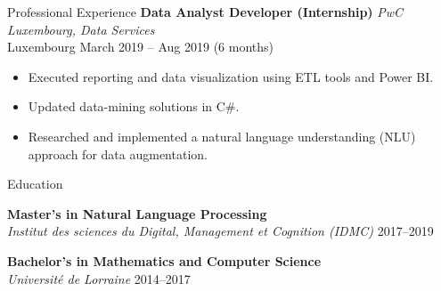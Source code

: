 \documentclass{resume} %
\begin{document}
\begin{rSection}{Professional Experience}
\textbf{Data Analyst Developer (Internship)} \hfill \textit{PwC Luxembourg, Data Services} \\
Luxembourg \hfill March 2019 -- Aug 2019 (6 months)
\begin{itemize}
    \item Executed reporting and data visualization using ETL tools and Power BI.
    \item Updated data-mining solutions in C\#.
    \item Researched and implemented a natural language understanding (NLU) approach for data augmentation.
\end{itemize}

\end{rSection}

\begin{rSection}{Education}

\textbf{Master's in Natural Language Processing} \\
\textit{Institut des sciences du Digital, Management et Cognition (IDMC)} \hfill 2017--2019

\textbf{Bachelor's in Mathematics and Computer Science} \\
\textit{Université de Lorraine} \hfill 2014--2017 \\
\end{rSection}
\end{document}
